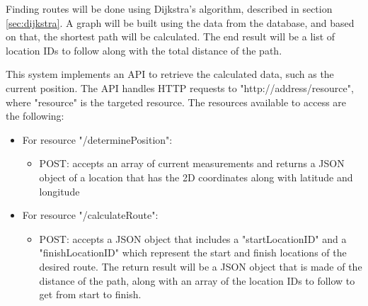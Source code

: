 Finding routes will be done using Dijkstra's algorithm, described in section \ref{sec:dijkstra}. A graph will be built using the data from the database, and based on that, the shortest path will be calculated. The end result will be a list of location IDs to follow along with the total distance of the path. 

This system implements an API to retrieve the calculated data, such as the current position. The API handles HTTP requests to "http://address/resource", where "resource" is the targeted resource. The resources available to access are the following:
\begin{itemize}
    \item For resource "/determinePosition":
    \begin{itemize}
        \item POST: accepts an array of current measurements and returns a JSON object of a location that has the 2D coordinates along with latitude and longitude
    \end{itemize}
    
    \item For resource "/calculateRoute":
    \begin{itemize}
        \item POST: accepts a JSON object that includes a "startLocationID" and a "finishLocationID" which represent the start and finish locations of the desired route. The return result will be a JSON object that is made of the distance of the path, along with an array of the location IDs to follow to get from start to finish.
    \end{itemize}
\end{itemize}


